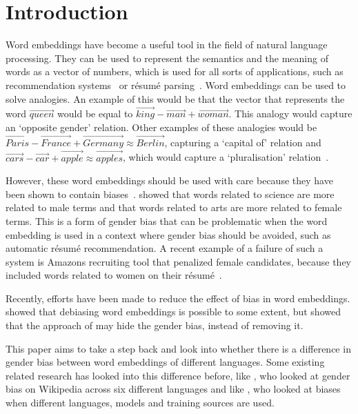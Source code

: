\section{Introduction}
Word embeddings have become a useful tool in the field of natural language
processing. They can be used to represent the semantics and the meaning of
words as a vector of numbers, which is used for all sorts of applications, such as
recommendation systems~\parencite{10.1145/3219819.3219885} or résumé
parsing~\parencite{large-scale-hoang-2017, nasser2018convolutional}. Word
embeddings can be used to solve analogies. An example of this would be that the
vector that represents the word
$\overrightarrow{queen}$ would be equal to $\overrightarrow{king} -
\overrightarrow{man} +
\overrightarrow{woman}$. This analogy would capture an `opposite gender' relation.
Other examples of these analogies would be $\overrightarrow{Paris} -
\overrightarrow{France} + \overrightarrow{Germany} \approx \overrightarrow{Berlin}$,
capturing a `capital of' relation and
$\overrightarrow{cars} - \overrightarrow{car} + \overrightarrow{apple} \approx
\overrightarrow{apples}$, which would capture a `pluralisation' relation~\parencite{vylomova-etal-2016-take}.

However, these word embeddings should be used with care because they have been
shown to contain biases~\parencite{caliskan_2017_semantics_language_corpora}.
\textcite{caliskan_2017_semantics_language_corpora} showed
that words related to science are more related to male terms and that
words related to arts are more related to female terms. This is a form of gender bias
that can be problematic when the word embedding is used in a context where gender bias
should be avoided, such as automatic résumé recommendation. A recent example of a failure
of such a system is Amazons recruiting tool that penalized female candidates, because they
included words related to women on their résumé~\parencite{dastin_2018}.

Recently, efforts have been made to reduce the effect of bias in word embeddings.
\textcite{bolukbasi_2016_quantifying_stereotypes} showed that debiasing word embeddings
is possible to some extent, but \textcite{gonen-goldberg-2019-lipstick-pig} showed that
the approach of \textcite{bolukbasi_2016_quantifying_stereotypes} may hide the
gender bias, instead of removing it.

This paper aims to take a step back and look into whether there is a difference in gender
bias between word embeddings of different languages. Some existing related research has
looked into this difference before, like \textcite{2015arXiv150106307W}, who looked at
gender bias on Wikipedia across six different languages and like \textcite{lauscher-glavas-2019-consistently}, who looked at biases when different languages, models and training
sources are used.

